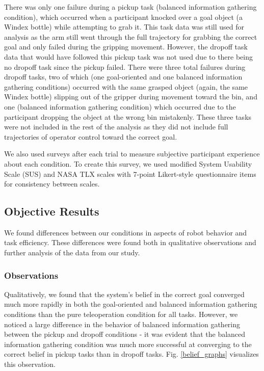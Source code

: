 \documentclass[conference]{IEEEtran}
\begin{document}
There was only one failure during a pickup task (balanced information gathering condition), which occurred when a participant knocked over a goal object (a Windex bottle) while attempting to grab it. This task data was still used for analysis as the arm still went through the full trajectory for grabbing the correct goal and only failed during the gripping movement. However, the dropoff task data that would have followed this pickup task was not used due to there being no dropoff task since the pickup failed. There were three total failures during dropoff tasks, two of which (one goal-oriented and one balanced information gathering conditions) occurred with the same grasped object (again, the same Windex bottle) slipping out of the gripper during movement toward the bin, and one (balanced information gathering condition) which occurred due to the participant dropping the object at the wrong bin mistakenly. These three tasks were not included in the rest of the analysis as they did not include full trajectories of operator control toward the correct goal.

We also used surveys after each trial to measure subjective participant experience about each condition. To create this survey, we used modified System Usability Scale (SUS) and NASA TLX scales with 7-point Likert-style questionnaire items for consistency between scales.


\subsection{Objective Results}

We found differences between our conditions in aspects of robot behavior and task efficiency. These differences were found both in qualitative observations and further analysis of the data from our study.

\subsubsection{Observations}
Qualitatively, we found that the system's belief in the correct goal converged much more rapidly in both the goal-oriented and balanced information gathering conditions than the pure teleoperation condition for all tasks. However, we noticed a large difference in the behavior of balanced information gathering between the pickup and dropoff conditions - it was evident that the balanced information gathering condition was much more successful at converging to the correct belief in pickup tasks than in dropoff tasks. Fig. \ref{belief_graphs} visualizes this observation.
\end{document}
